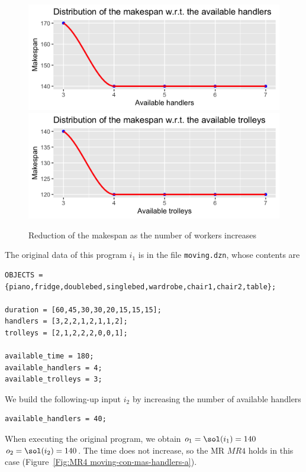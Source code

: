 \begin{figure}\centering
  \includegraphics[scale=0.23]{Figures/1.png}
  \includegraphics[scale=0.23]{Figures/2.png}
  \caption{Reduction of the makespan as the number of workers
    increases}
  \label{fig:more_workers}
\end{figure}

The original data of this program $i_{1}$ is in the file
\lstinline|moving.dzn|, whose contents are

\begin{lstlisting}
OBJECTS = {piano,fridge,doublebed,singlebed,wardrobe,chair1,chair2,table};

duration = [60,45,30,30,20,15,15,15];
handlers = [3,2,2,1,2,1,1,2];
trolleys = [2,1,2,2,2,0,0,1];

available_time = 180;
available_handlers = 4;
available_trolleys = 3;
\end{lstlisting}
We build the following-up input $i_{2}$ by increasing the number of
available handlers
\begin{lstlisting}
available_handlers = 40;
\end{lstlisting}
When executing the original program, we obtain $o_{1}=\sol(i_{1})=140$
$o_{2}=\sol(i_{2})=140$. The time does not increase, so the
MR $MR4$ holds in this case
(Figure~\ref{Fig:MR4 moving-con-mas-handlers-a}).

